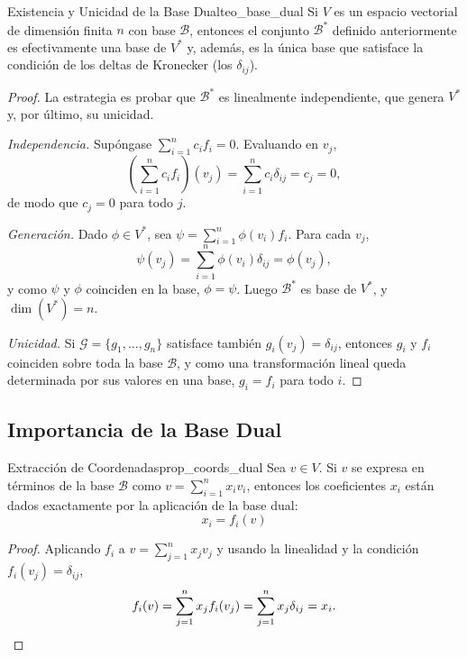 \documentclass[11pt, a4paper]{article}
\begin{document}
\begin{teorema}{Existencia y Unicidad de la Base Dual}{teo_base_dual}
Si $V$ es un espacio vectorial de dimensión finita $n$ con base $\mathcal{B}$, entonces el conjunto $\mathcal{B}^*$ definido anteriormente es efectivamente una base de $V^*$ y, además, es la única base que satisface la condición de los deltas de Kronecker (los $\delta_{ij}$).
\end{teorema}

\begin{proof}
La estrategia es probar que $\mathcal{B}^*$ es linealmente independiente, que genera $V^*$ y, por último, su unicidad.

\textit{Independencia.} Supóngase $\sum_{i=1}^n c_i f_i = 0$. Evaluando en $v_j$,
\[
\left( \sum_{i=1}^n c_i f_i \right)(v_j) = \sum_{i=1}^n c_i \delta_{ij} = c_j = 0,
\]
de modo que $c_j = 0$ para todo $j$.

\textit{Generación.} Dado $\phi \in V^*$, sea $\psi = \sum_{i=1}^n \phi(v_i) f_i$. Para cada $v_j$,
\[
\psi(v_j) = \sum_{i=1}^n \phi(v_i) \delta_{ij} = \phi(v_j),
\]
y como $\psi$ y $\phi$ coinciden en la base, $\phi = \psi$. Luego $\mathcal{B}^*$ es base de $V^*$, y $\dim(V^*) = n$.

\textit{Unicidad.} Si $\mathcal{G} = \{g_1, \dots, g_n\}$ satisface también $g_i(v_j) = \delta_{ij}$, entonces $g_i$ y $f_i$ coinciden sobre toda la base $\mathcal{B}$, y como una transformación lineal queda determinada por sus valores en una base, $g_i = f_i$ para todo $i$.
\end{proof}

\subsection{Importancia de la Base Dual}

\begin{proposicion}{Extracción de Coordenadas}{prop_coords_dual}
Sea $v \in V$. Si $v$ se expresa en términos de la base $\mathcal{B}$ como $v = \sum_{i=1}^n x_i v_i$, entonces los coeficientes $x_i$ están dados exactamente por la aplicación de la base dual:
\[
x_i = f_i(v)
\]
\end{proposicion}

\begin{proof}
Aplicando $f_i$ a $v = \sum_{j=1}^n x_j v_j$ y usando la linealidad y la condición $f_i(v_j) = \delta_{ij}$,
\[
f_i(v) = \sum_{j=1}^n x_j f_i(v_j) = \sum_{j=1}^n x_j \delta_{ij} = x_i. \qedhere
\]
\end{proof}
\end{document}

